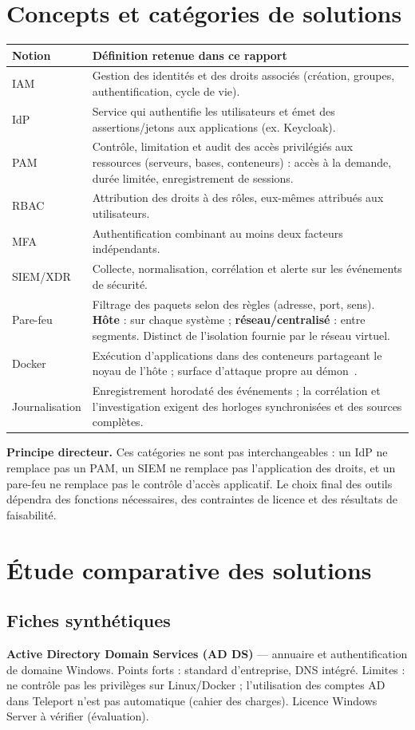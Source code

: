 \documentclass[11pt,a4paper]{report}
\begin{document}
\section{Concepts et catégories de solutions}
\begin{longtable}{@{}p{2.6cm}p{13.2cm}@{}}
\toprule
\textbf{Notion} & \textbf{Définition retenue dans ce rapport}\\ \midrule\endhead
IAM & Gestion des identités et des droits associés (création, groupes, authentification, cycle de vie).\\
IdP & Service qui authentifie les utilisateurs et émet des assertions/jetons aux applications (ex. Keycloak).\\
PAM & Contrôle, limitation et audit des accès privilégiés aux ressources (serveurs, bases, conteneurs) : accès à la demande, durée limitée, enregistrement de sessions.\\
RBAC & Attribution des droits à des rôles, eux-mêmes attribués aux utilisateurs.\\
MFA & Authentification combinant au moins deux facteurs indépendants.\\
SIEM/XDR & Collecte, normalisation, corrélation et alerte sur les événements de sécurité.\\
Pare-feu & Filtrage des paquets selon des règles (adresse, port, sens). \textbf{Hôte} : sur chaque système ; \textbf{réseau/centralisé} : entre segments. Distinct de l'isolation fournie par le réseau virtuel.\\
Docker & Exécution d'applications dans des conteneurs partageant le noyau de l'hôte ; surface d'attaque propre au démon~\cite{docker-sec}.\\
Journalisation & Enregistrement horodaté des événements ; la corrélation et l'investigation exigent des horloges synchronisées et des sources complètes.\\
\bottomrule
\end{longtable}
\textbf{Principe directeur.} Ces catégories ne sont pas interchangeables : un IdP ne remplace pas un PAM, un SIEM ne remplace pas l'application des droits, et un pare-feu ne remplace pas le contrôle d'accès applicatif. Le choix final des outils dépendra des fonctions nécessaires, des contraintes de licence et des résultats de faisabilité.

\section{Étude comparative des solutions}
\subsection{Fiches synthétiques}
\textbf{Active Directory Domain Services (AD DS)} --- annuaire et authentification de domaine Windows. Points forts : standard d'entreprise, DNS intégré. Limites : ne contrôle pas les privilèges sur Linux/Docker ; l'utilisation des comptes AD dans Teleport n'est pas automatique (cahier des charges). Licence Windows Server à vérifier (évaluation).
\end{document}
